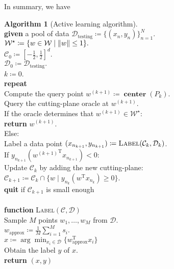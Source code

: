 \documentclass[11pt]{amsart}
\theoremstyle{definition}
\newtheorem{algorithm}{Algorithm}
\theoremstyle{remark}
\newcommand{\ind}{\hspace*{0.5cm}}
\newcommand{\transpose}{\text{T}}
\DeclareMathOperator{\centerr}{\textbf{center}}
\begin{document}
        In summary, we have
        \begin{algorithm}[Active learning algorithm]
        \label{a:active}\mbox{}\\
            \ind \textbf{given} a pool of data $\mathcal{D}_\text{testing} \coloneqq \{(x_n, y_n)\}_{n=1}^N$. \\
            \ind $\mathcal{W}^\star \coloneqq \{w \in \mathcal{W} \;|\; \norm{w} \leq 1\}.$ \\
            \ind $\mathcal{C}_0 \coloneqq [-\frac{1}{2}, \frac{1}{2}]^d.$ \\
            \ind $\mathcal{D}_0 \coloneqq \mathcal{D}_\text{testing}.$ \\
            \ind $k \coloneqq 0$. \\
            \ind \textbf{repeat} \\
            \ind\ind Compute the query point $w^{(k+1)} \coloneqq \centerr({P}_k)$. \\
            \ind\ind Query the cutting-plane oracle at $w^{(k+1)}$. \\
            \ind\ind If the oracle determines that $w^{(k+1)} \in \mathcal{W}^\star$: \\
            \ind\ind\ind\textbf{return} $w^{(k+1)}$. \\
            \ind\ind Else: \\
            \ind\ind\ind Label a data point $(x_{n_{k+1}}, y_{n_{k+1}}) \coloneqq \textsc{Label}(\mathcal{C}_k, \mathcal{D}_k)$. \\
            \ind\ind\ind If $y_{n_{k+1}} ({w^{(k+1)}}^\transpose x_{n_{k+1}}) < 0:$ \\
            \ind\ind\ind\ind Update $\mathcal{C}_k$ by adding the new cutting-plane: \\
            \ind\ind\ind\ind\ind $\mathcal{C}_{k+1} \coloneqq \mathcal{C}_{k} \cap \{w \;|\; y_{n_k} (w^\transpose x_{n_k}) \geq 0\}$. \\
            \ind\ind \textbf{quit} if $\mathcal{C}_{k+1}$ is small enough \\ \\
            \ind \textbf{function} \textsc{Label}$(\mathcal{C}, \mathcal{D})$ \\
            \ind\ind Sample $M$ points $w_1, \dots, w_M$ from $\mathcal{D}$. \\
            \ind\ind $w_\text{approx} \coloneqq \frac{1}{M} \sum_{i=1}^M s_i$. \\
            \ind\ind $x \coloneqq \arg \min_{x_i \in \mathcal{D}} \{w_\text{approx}^\transpose x_i \}$ \\
            \ind\ind Obtain the label $y$ of $x$. \\
            \ind \textbf{return} $(x, y) $     
            \end{algorithm}
\end{document}
